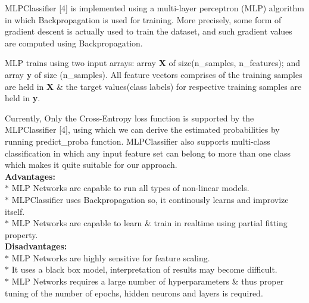 \documentclass[a4paper, 10pt, conference]{IEEEtran}
\begin{document}
MLPClassifier [4] is implemented using a multi-layer perceptron (MLP) algorithm in which Backpropagation is used for training. More precisely, some form of gradient descent is actually used to train the dataset, and such gradient values are computed using Backpropagation.

MLP trains using two input arrays: array \textbf{X} of size(n\_samples, n\_features); and array \textbf{y} of size (n\_samples). All feature vectors comprises of the training samples are held in \textbf{X} \& the target values(class labels) for respective training samples are held in \textbf{y}.

Currently, Only the Cross-Entropy loss function is supported by the MLPClassifier [4], using which we can derive the estimated probabilities by running predict\_proba function. MLPClassifier also supports multi-class classification in which any input feature set can belong to more than one class which makes it quite suitable for our approach. \\

\textbf{Advantages:}\\
\indent $\ast$ MLP Networks are capable to run all types of non-linear models.\\
\indent $\ast$ MLPClassifier uses Backpropagation so, it continously learns and improvize itself.\\
\indent $\ast$ MLP Networks are capable to learn \& train in real\-time using partial fitting property.\\

\textbf{Disadvantages:}\\
\indent $\ast$ MLP Networks are highly sensitive for feature scaling.\\
\indent $\ast$ It uses a black box model, interpretation of results may become difficult.\\
\indent $\ast$ MLP Networks requires a large number of hyperparameters \& thus proper tuning of the number of epochs, hidden neurons and layers is required.
\end{document}
